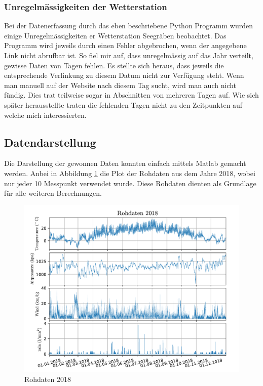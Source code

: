 \begin{refsection}
\subsubsection{Unregelmässigkeiten der Wetterstation}
Bei der Datenerfassung durch das eben beschriebene Python Programm wurden einige Unregelmässigkeiten er Wetterstation Seegräben beobachtet.
Das Programm wird jeweils durch einen Fehler abgebrochen, wenn der angegebene Link nicht abrufbar ist. 
So fiel mir auf, dass unregelmässig auf das Jahr verteilt, gewisse Daten von Tagen fehlen. Es stellte sich heraus, dass jeweils die entsprechende Verlinkung zu diesem Datum nicht zur Verfügung steht.
Wenn man manuell auf der Website nach diesem Tag sucht, wird man auch nicht fündig.
Dies trat teilweise sogar in Abschnitten von mehreren Tagen auf.
Wie sich später herausstellte traten die fehlenden Tagen nicht zu den Zeitpunkten auf welche mich interessierten.


\subsection{Datendarstellung}
Die Darstellung der gewonnen Daten konnten einfach mittels Matlab gemacht werden.
Anbei in Abbildung \ref{fig:rawdata} \space die Plot der Rohdaten aus dem Jahre 2018, wobei nur jeder 10 Messpunkt verwendet wurde.
Diese Rohdaten dienten als Grundlage für alle weiteren Berechnungen. 
\begin{figure}
	\centering
	\includegraphics[width=1\textwidth]{papers/wwt/images/raw.pdf}
	\caption{Rohdaten 2018}
	\label{fig:rawdata}
\end{figure}


\end{refsection}
